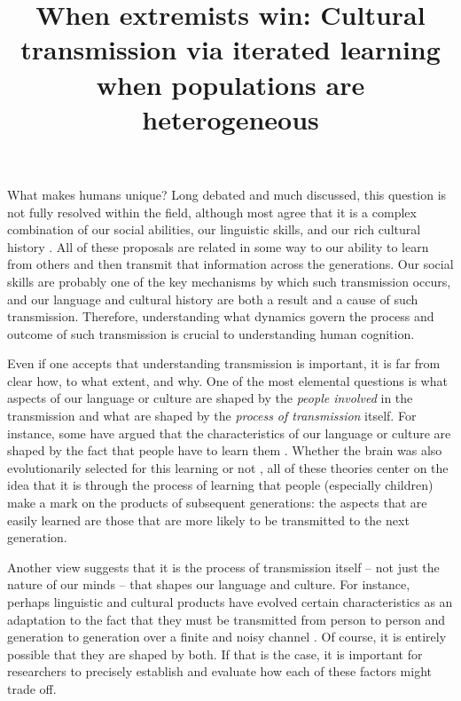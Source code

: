 \documentclass[doc]{apa6}
\title{When extremists win: Cultural transmission via iterated learning when populations are heterogeneous}
\begin{document}
\maketitle

What makes humans unique? Long debated and much discussed, this question is not fully resolved within the field, although most agree that it is a complex combination of our social abilities, our linguistic skills, and our rich cultural history \parencite{sperber96,tomasello99,pinkerjackendoff05,hermannetal07,gintis11,scottphillips14}. All of these proposals are related in some way to our ability to learn from others and then transmit that information across the generations. Our social skills are probably one of the key mechanisms by which such transmission occurs, and our language and cultural history are both a result and a cause of such transmission. Therefore, understanding what dynamics govern the process and outcome of such transmission is crucial to understanding human cognition.

Even if one accepts that understanding transmission is important, it is far from clear how, to what extent, and why. One of the most elemental questions is what aspects of our language or culture are shaped by the {\it people involved} in the transmission and what are shaped by the {\it process of transmission} itself. For instance, some have argued that the characteristics of our language or culture are shaped by the fact that people have to learn them \parencite{pinkerbloom90,deacon97,pinker03,christiansenchater08,kempregier12}. Whether the brain was also evolutionarily selected for this learning \parencite{pinker03} or not \parencite{christiansenchater08}, all of these theories center on the idea that it is through the process of learning that people (especially children) make a mark on the products of subsequent generations: the aspects that are easily learned are those that are more likely to be transmitted to the next generation.

Another view suggests that it is the process of transmission itself -- not just the nature of our minds -- that shapes our language and culture. For instance, perhaps linguistic and cultural products have evolved certain characteristics as an adaptation to the fact that they must be transmitted from person to person and generation to generation over a finite and noisy channel \parencite{kirby01,kirbyetal15}. Of course, it is entirely possible that they are shaped by both. If that is the case, it is important for researchers to precisely establish and evaluate how each of these factors might trade off.
\end{document}
